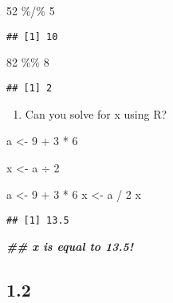 \documentclass[
]{book}
\newenvironment{Shaded}{\begin{snugshade}}{\end{snugshade}}
\newcommand{\DecValTok}[1]{\textcolor[rgb]{0.00,0.00,0.81}{#1}}
\newcommand{\DocumentationTok}[1]{\textcolor[rgb]{0.56,0.35,0.01}{\textbf{\textit{#1}}}}
\newcommand{\NormalTok}[1]{#1}
\newcommand{\OtherTok}[1]{\textcolor[rgb]{0.56,0.35,0.01}{#1}}
\newcommand{\SpecialCharTok}[1]{\textcolor[rgb]{0.00,0.00,0.00}{#1}}
\providecommand{\tightlist}{%
  \setlength{\itemsep}{0pt}\setlength{\parskip}{0pt}}
\begin{document}
\begin{Shaded}
\begin{Highlighting}[]
\DecValTok{52} \SpecialCharTok{\%/\%} \DecValTok{5}
\end{Highlighting}
\end{Shaded}

\begin{verbatim}
## [1] 10
\end{verbatim}

\begin{Shaded}
\begin{Highlighting}[]
\DecValTok{82} \SpecialCharTok{\%\%} \DecValTok{8}
\end{Highlighting}
\end{Shaded}

\begin{verbatim}
## [1] 2
\end{verbatim}

\begin{enumerate}
\def\labelenumi{\alph{enumi}.}
\setcounter{enumi}{1}
\tightlist
\item
  Can you solve for x using R?
\end{enumerate}

a \textless- 9 + 3 * 6

x \textless- a ÷ 2

\begin{Shaded}
\begin{Highlighting}[]
\NormalTok{a }\OtherTok{\textless{}{-}} \DecValTok{9} \SpecialCharTok{+} \DecValTok{3} \SpecialCharTok{*} \DecValTok{6}
\NormalTok{x }\OtherTok{\textless{}{-}}\NormalTok{ a }\SpecialCharTok{/} \DecValTok{2}
\NormalTok{x}
\end{Highlighting}
\end{Shaded}

\begin{verbatim}
## [1] 13.5
\end{verbatim}

\begin{Shaded}
\begin{Highlighting}[]
\DocumentationTok{\#\# x is equal to 13.5!}
\end{Highlighting}
\end{Shaded}

\hypertarget{section-1}{%
\subsection{1.2}\label{section-1}}
\end{document}
